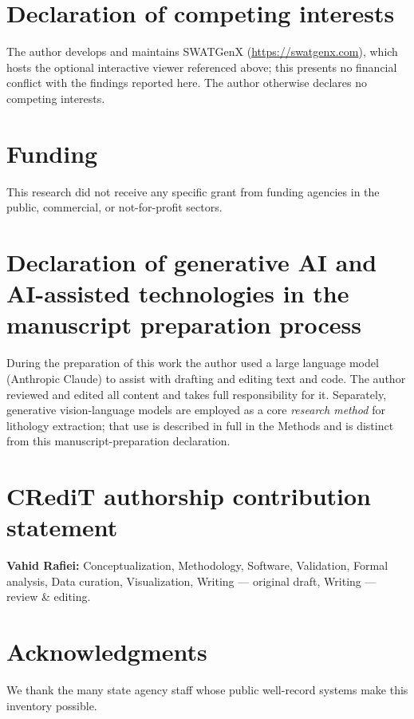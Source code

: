 \documentclass[12pt]{article}
\begin{document}
\section*{Declaration of competing interests}
The author develops and maintains SWATGenX (\url{https://swatgenx.com}), which hosts the optional
interactive viewer referenced above; this presents no financial conflict with the findings reported here.
The author otherwise declares no competing interests.

\section*{Funding}
This research did not receive any specific grant from funding agencies in the public, commercial, or
not-for-profit sectors.

\section*{Declaration of generative AI and AI-assisted technologies in the manuscript preparation process}
During the preparation of this work the author used a large language model (Anthropic Claude) to assist
with drafting and editing text and code. The author reviewed and edited all content and takes full
responsibility for it. Separately, generative vision-language models are employed as a core \emph{research
method} for lithology extraction; that use is described in full in the Methods and is distinct from this
manuscript-preparation declaration.

\section*{CRediT authorship contribution statement}
\textbf{Vahid Rafiei:} Conceptualization, Methodology, Software, Validation, Formal analysis, Data
curation, Visualization, Writing --- original draft, Writing --- review \& editing.

\section*{Acknowledgments}
We thank the many state agency staff whose public well-record systems make this inventory possible.



\end{document}
